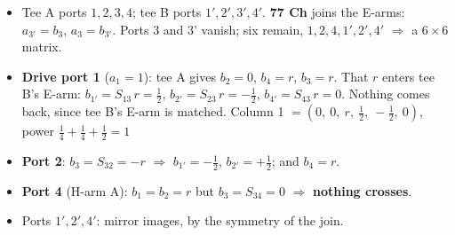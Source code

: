 \par{}
\begin{itemize}
  \item Tee A ports $1, 2, 3, 4$; tee B ports $1', 2', 3', 4'$. \textbf{77 Ch} joins the
    E-arms: $a_{3'} = b_3$, $a_3 = b_{3'}$. Ports 3 and 3' vanish; six remain,
    $1, 2, 4, 1', 2', 4'$ $\Rightarrow$ a $6\times6$ matrix.
  \item \textbf{Drive port 1} ($a_1 = 1$): tee A gives $b_2 = 0$, $b_4 = r$, $b_3 = r$. That
    $r$ enters tee B's E-arm: $b_{1'} = S_{13}\,r = \tfrac12$,
    $b_{2'} = S_{23}\,r = -\tfrac12$, $b_{4'} = S_{43}\,r = 0$. Nothing comes back, since
    tee B's E-arm is matched. Column 1 $= (0,\ 0,\ r,\ \tfrac12,\ -\tfrac12,\ 0)$, power
    $\tfrac14 + \tfrac14 + \tfrac12 = 1$ \checkmark
  \item \textbf{Port 2}: $b_3 = S_{32} = -r$ $\Rightarrow$ $b_{1'} = -\tfrac12$,
    $b_{2'} = +\tfrac12$; and $b_4 = r$.
  \item \textbf{Port 4} (H-arm A): $b_1 = b_2 = r$ but $b_3 = S_{34} = 0$ $\Rightarrow$
    \textbf{nothing crosses}.
  \item Ports $1', 2', 4'$: mirror images, by the symmetry of the join.
\end{itemize}
\par{}
